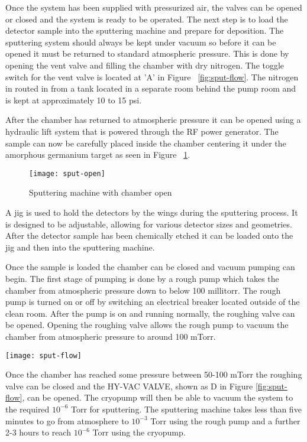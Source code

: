 Once the system has been supplied with pressurized air, the valves can be opened or closed and the system is ready to be operated.
The next step is to load the detector sample into the sputtering machine and prepare for deposition.
The sputtering system should always be kept under vacuum so before it can be opened it must be returned to standard atmospheric pressure.
This is done by opening the vent valve and filling the chamber with dry nitrogen.
The toggle switch for the vent valve is located at 'A' in Figure ~\ref{fig:sput-flow}.
The nitrogen in routed in from a tank located in a separate room behind the pump room and is kept at approximately 10 to 15 psi.

After the chamber has returned to atmospheric pressure it can be opened using a hydraulic lift system that is powered through the RF power generator.
The sample can now be carefully placed inside the chamber centering it under the amorphous germanium target as seen in Figure ~\ref{fig:sput-open}.
\begin{figure}[htpb]
\centering
\texttt{[image: sput-open]}
\caption{Sputtering machine with chamber open}
\label{fig:sput-open}
\end{figure}
A jig is used to hold the detectors by the wings during the sputtering process.
It is designed to be adjustable, allowing for various detector sizes and geometries.
After the detector sample has been chemically etched it can be loaded onto the jig and then into the sputtering machine.

Once the sample is loaded the chamber can be closed and vacuum pumping can begin.
The first stage of pumping is done by a rough pump which takes the chamber from atmospheric pressure down to below 100 millitorr.
The rough pump is turned on or off by switching an electrical breaker located outside of the clean room.
After the pump is on and running normally, the roughing valve can be opened.
Opening the roughing valve allows the rough pump to vacuum the chamber from atmospheric pressure to around 100 mTorr.

\begin{sidewaysfigure}
\texttt{[image: sput-flow]}
\caption{This is a diagram of the Sputtering machine vacuum and gas system. Each valve is connected to a pressurized air line.}
\label{fig:sput-flow}
\end{sidewaysfigure}

Once the chamber has reached some pressure between 50-100 mTorr the roughing valve can be closed and the HY-VAC VALVE, shown as D in Figure \ref{fig:sput-flow}, can be opened.
The cryopump will then be able to vacuum the system to the required $10^{-6}$ Torr for sputtering.
The sputtering machine takes less than five minutes to go from atmosphere to $10^{-3}$ Torr using the rough pump and a further 2-3 hours to reach $10^{-6}$ Torr using the cryopump.

